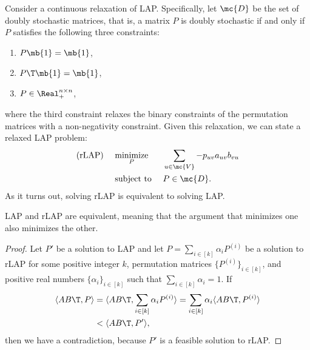 \documentclass[10pt,journal,cspaper,compsoc]{IEEEtran}
\begin{document}

Consider a continuous relaxation of LAP.  Specifically, let $\mc{D}$ be the set of doubly stochastic matrices, that is, a matrix $P$ is doubly stochastic if and only if $P$ satisfies the following three constraints: 
\begin{enumerate}
\item	$P\mb{1} = \mb{1}$,
\item	$P\T \mb{1}=\mb{1}$, %
\item 	$P \in  \Real_+^{n \times n}$,
\end{enumerate}
where the third constraint relaxes the binary constraints of the permutation matrices with a non-negativity constraint.  Given this relaxation, we can state a relaxed LAP problem:
\begin{subequations} \label{eq:rLAP}
\begin{align}
		\text{(rLAP) } \quad &\underset{P}{\text{minimize}}  &&\sum_{u \in \mc{V}} -p_{uv} a_{uv} b_{vu}  \\
		&\text{subject to } && P \in \mc{D}.
\end{align}
\end{subequations}
As it turns out, solving rLAP is equivalent to solving LAP.
\begin{prop}
	LAP and rLAP are equivalent, meaning that the argument that minimizes one also minimizes the other.
\end{prop}
\begin{proof}
	Let $P'$ be a solution to LAP and let $P = \sum_{i\in[k]} \alpha_i P^{(i)}$ be a solution to rLAP for some positive integer $k$, permutation matrices $\{P^{(i)}\}_{i \in [k]}$, and positive real numbers $\{\alpha_i\}_{i \in[k]}$ such that $\sum_{i \in [k]} \alpha_i=1$.  If 
	\begin{align*}
	\langle AB\T,P\rangle &= \langle AB\T,  \sum_{i\in[k]} \alpha_i P^{(i)}\rangle=  \sum_{i\in[k]} \alpha_i \langle AB\T,  P^{(i)}\rangle	 \\
	&< \langle AB\T,P'\rangle,
	\end{align*}
	then we have a contradiction, because $P'$ is a feasible solution to rLAP.
	\end{proof}
\end{document}
